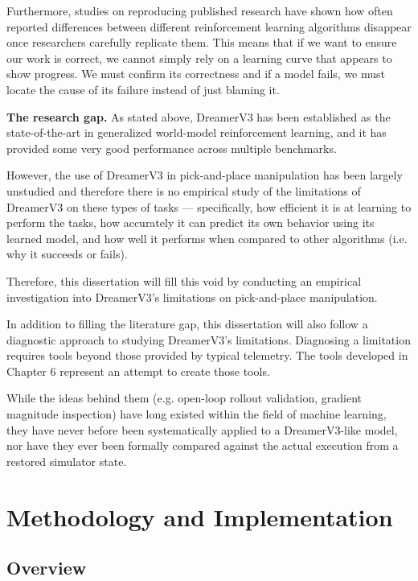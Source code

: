 \documentclass[12pt,a4paper,oneside]{report}
\begin{document}
Furthermore, studies on reproducing published research have shown how often reported differences between different reinforcement learning algorithms disappear once researchers carefully replicate them. This means that if we want to ensure our work is correct, we cannot simply rely on a learning curve that appears to show progress. We must confirm its correctness and if a model fails, we must locate the cause of its failure instead of just blaming it.

\textbf{The research gap.} As stated above, DreamerV3 has been established as the state-of-the-art in generalized world-model reinforcement learning, and it has provided some very good performance across multiple benchmarks.

However, the use of DreamerV3 in pick-and-place manipulation has been largely unstudied and therefore there is no empirical study of the limitations of DreamerV3 on these types of tasks — specifically, how efficient it is at learning to perform the tasks, how accurately it can predict its own behavior using its learned model, and how well it performs when compared to other algorithms (i.e. why it succeeds or fails).

Therefore, this dissertation will fill this void by conducting an empirical investigation into DreamerV3's limitations on pick-and-place manipulation.

In addition to filling the literature gap, this dissertation will also follow a diagnostic approach to studying DreamerV3's limitations. Diagnosing a limitation requires tools beyond those provided by typical telemetry. The tools developed in Chapter 6 represent an attempt to create those tools.

While the ideas behind them (e.g. open-loop rollout validation, gradient magnitude inspection) have long existed within the field of machine learning, they have never before been systematically applied to a DreamerV3-like model, nor have they ever been formally compared against the actual execution from a restored simulator state.

\newpage

\hypertarget{methodology-and-implementation}{%
\chapter{Methodology and Implementation}\label{methodology-and-implementation}}

\hypertarget{overview}{%
\section{Overview}\label{overview}}
\end{document}
